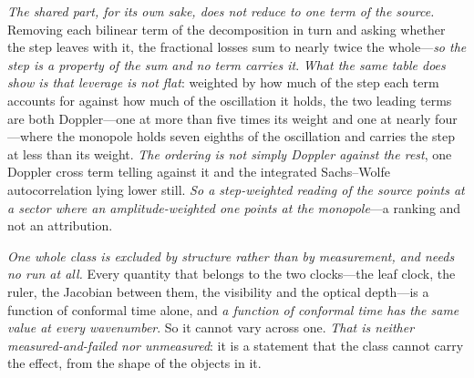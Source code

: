 \documentclass[11pt,a4paper]{article}
\theoremstyle{plain}
\theoremstyle{definition}
\theoremstyle{remark}
\begin{document}
\emph{The shared part, for its own sake, does not reduce to one term of the source.} Removing each bilinear
term of the decomposition in turn and asking whether the step leaves with it, the fractional losses sum to
nearly twice the whole---\emph{so the step is a property of the sum and no term carries it}. \emph{What the
same table does show is that leverage is not flat}: weighted by how much of the step each term accounts for
against how much of the oscillation it holds, the two leading terms are both Doppler---one at more than five
times its weight and one at nearly four---where the monopole holds seven eighths of the oscillation and
carries the step at less than its weight. \emph{The ordering is not simply Doppler against the rest}, one
Doppler cross term telling against it and the integrated Sachs--Wolfe autocorrelation lying lower still.
\emph{So a step-weighted reading of the source points at a sector where an amplitude-weighted one points at
the monopole}---a ranking and not an
attribution.

\emph{One whole class is excluded by structure rather than by measurement, and needs no run at all.} Every
quantity that belongs to the two clocks---the leaf clock, the ruler, the Jacobian between them, the
visibility and the optical depth---is a function of conformal time alone, and \emph{a function of conformal
time has the same value at every wavenumber}. So it cannot vary across one. \emph{That is neither
measured-and-failed nor unmeasured}: it is a statement that the class cannot carry the effect, from the shape
of the objects in it.
\end{document}
